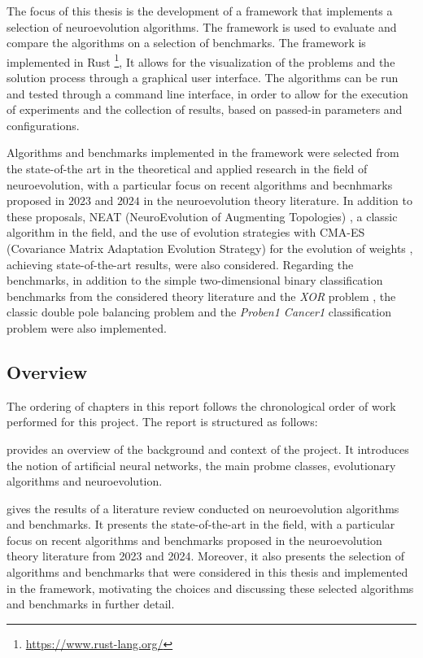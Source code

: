 The focus of this thesis is the development of a framework that implements a selection of neuroevolution algorithms.
The framework is used to evaluate and compare the algorithms on a selection of benchmarks.
The framework is implemented in Rust \footnote{\url{https://www.rust-lang.org/}},
It allows for the visualization of the problems and the solution process through a graphical user interface.
The algorithms can be run and tested through a command line interface, in order to allow for the execution of experiments and the collection of results,
based on passed-in parameters and configurations.

Algorithms and benchmarks implemented in the framework were selected from the state-of-the art in the theoretical and applied research in the field of neuroevolution,
with a particular focus on recent algorithms and becnhmarks proposed in $2023$ and $2024$ in the neuroevolution theory literature.
In addition to these proposals, NEAT (NeuroEvolution of Augmenting Topologies) \cite{neat}, a classic algorithm in the field, and the use of evolution strategies with CMA-ES
(Covariance Matrix Adaptation Evolution Strategy) for the evolution of weights \cite{cmaes}, achieving state-of-the-art results, were also considered.
Regarding the benchmarks, in addition to the simple two-dimensional binary classification benchmarks from the considered theory literature \cite{na,bna} and the \textit{XOR} problem \cite{neat},
the classic double pole balancing problem \cite{pole_balancing} and the \textit{Proben1 Cancer1} \cite{proben} classification problem were also implemented.

\subsection{Overview}

The ordering of chapters in this report follows the chronological order of work performed for this project.
The report is structured as follows:

 provides an overview of the background and context of the project. It introduces the notion of artificial neural networks, the main probme classes,
evolutionary algorithms and neuroevolution.

 gives the results of a literature review conducted on neuroevolution algorithms and benchmarks. It presents the state-of-the-art in the field,
with a particular focus on recent algorithms and benchmarks proposed in the neuroevolution theory literature from 2023 and 2024.
Moreover, it also presents the selection of algorithms and benchmarks that were considered in this thesis and implemented in the framework, motivating the choices and
discussing these selected algorithms and benchmarks in further detail.

